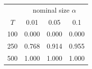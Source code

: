 % 
\begin{tabular}{cccc}
  \hline
  & \multicolumn{3}{c}{nominal size $\alpha$} \\
 $T$ & 0.01 & 0.05 & 0.1 \\
 \hline
100 & 0.000 & 0.000 & 0.000 \\ 
  250 & 0.768 & 0.914 & 0.955 \\ 
  500 & 1.000 & 1.000 & 1.000 \\ 
   \hline
\end{tabular}
